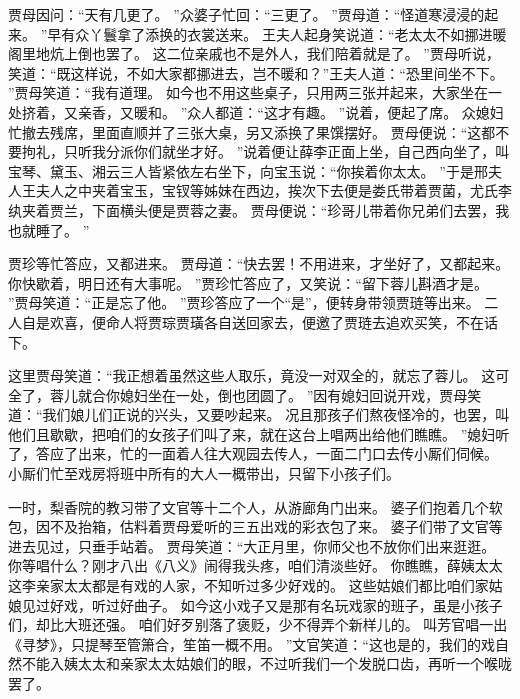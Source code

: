 贾母因问：“天有几更了。
”众婆子忙回：“三更了。
”贾母道：“怪道寒浸浸的起来。
”早有众丫鬟拿了添换的衣裳送来。
王夫人起身笑说道：“老太太不如挪进暖阁里地炕上倒也罢了。
这二位亲戚也不是外人，我们陪着就是了。
”贾母听说，笑道：“既这样说，不如大家都挪进去，岂不暖和？”王夫人道：“恐里间坐不下。
”贾母笑道：“我有道理。
如今也不用这些桌子，只用两三张并起来，大家坐在一处挤着，又亲香，又暖和。
”众人都道：“这才有趣。
”说着，便起了席。
众媳妇忙撤去残席，里面直顺并了三张大桌，另又添换了果馔摆好。
贾母便说：“这都不要拘礼，只听我分派你们就坐才好。
”说着便让薛李正面上坐，自己西向坐了，叫宝琴、黛玉、湘云三人皆紧依左右坐下，向宝玉说：“你挨着你太太。
”于是邢夫人王夫人之中夹着宝玉，宝钗等姊妹在西边，挨次下去便是娄氏带着贾菌，尤氏李纨夹着贾兰，下面横头便是贾蓉之妻。
贾母便说：“珍哥儿带着你兄弟们去罢，我也就睡了。
”\par
贾珍等忙答应，又都进来。
贾母道：“快去罢！不用进来，才坐好了，又都起来。
你快歇着，明日还有大事呢。
”贾珍忙答应了，又笑说：“留下蓉儿斟酒才是。
”贾母笑道：“正是忘了他。
”贾珍答应了一个“是”，便转身带领贾琏等出来。
二人自是欢喜，便命人将贾琮贾璜各自送回家去，便邀了贾琏去追欢买笑，不在话下。
\par
这里贾母笑道：“我正想着虽然这些人取乐，竟没一对双全的，就忘了蓉儿。
这可全了，蓉儿就合你媳妇坐在一处，倒也团圆了。
”因有媳妇回说开戏，贾母笑道：“我们娘儿们正说的兴头，又要吵起来。
况且那孩子们熬夜怪冷的，也罢，叫他们且歇歇，把咱们的女孩子们叫了来，就在这台上唱两出给他们瞧瞧。
”媳妇听了，答应了出来，忙的一面着人往大观园去传人，一面二门口去传小厮们伺候。
小厮们忙至戏房将班中所有的大人一概带出，只留下小孩子们。
\par
一时，梨香院的教习带了文官等十二个人，从游廊角门出来。
婆子们抱着几个软包，因不及抬箱，估料着贾母爱听的三五出戏的彩衣包了来。
婆子们带了文官等进去见过，只垂手站着。
贾母笑道：“大正月里，你师父也不放你们出来逛逛。
你等唱什么？刚才八出《八义》闹得我头疼，咱们清淡些好。
你瞧瞧，薛姨太太这李亲家太太都是有戏的人家，不知听过多少好戏的。
这些姑娘们都比咱们家姑娘见过好戏，听过好曲子。
如今这小戏子又是那有名玩戏家的班子，虽是小孩子们，却比大班还强。
咱们好歹别落了褒贬，少不得弄个新样儿的。
叫芳官唱一出《寻梦》，只提琴至管箫合，笙笛一概不用。
”文官笑道：“这也是的，我们的戏自然不能入姨太太和亲家太太姑娘们的眼，不过听我们一个发脱口齿，再听一个喉咙罢了。
